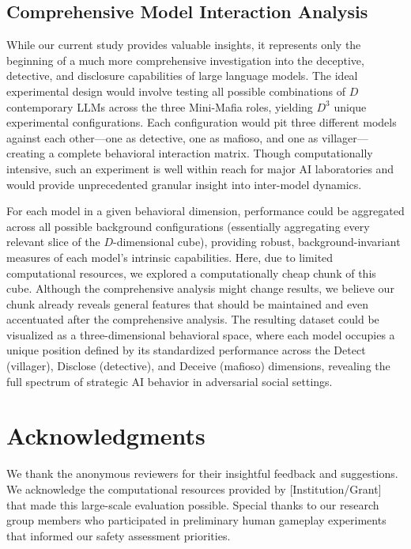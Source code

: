 \documentclass{article}
\begin{document}
\subsection{Comprehensive Model Interaction Analysis}

While our current study provides valuable insights, it represents only the beginning of a much more comprehensive investigation into the deceptive, detective, and disclosure capabilities of large language models. The ideal experimental design would involve testing all possible combinations of $D$ contemporary LLMs across the three Mini-Mafia roles, yielding $D^3$ unique experimental configurations. Each configuration would pit three different models against each other—one as detective, one as mafioso, and one as villager—creating a complete behavioral interaction matrix. Though computationally intensive, such an experiment is well within reach for major AI laboratories and would provide unprecedented granular insight into inter-model dynamics.

For each model in a given behavioral dimension, performance could be aggregated across all possible background configurations (essentially aggregating every relevant slice of the $D$-dimensional cube), providing robust, background-invariant measures of each model's intrinsic capabilities. Here, due to limited computational resources, we explored a computationally cheap chunk of this cube. Although the comprehensive analysis might change results, we believe our chunk already reveals general features that should be maintained and even accentuated after the comprehensive analysis. The resulting dataset could be visualized as a three-dimensional behavioral space, where each model occupies a unique position defined by its standardized performance across the Detect (villager), Disclose (detective), and Deceive (mafioso) dimensions, revealing the full spectrum of strategic AI behavior in adversarial social settings.

\section*{Acknowledgments}

We thank the anonymous reviewers for their insightful feedback and suggestions. We acknowledge the computational resources provided by [Institution/Grant] that made this large-scale evaluation possible. Special thanks to our research group members who participated in preliminary human gameplay experiments that informed our safety assessment priorities.
\end{document}

